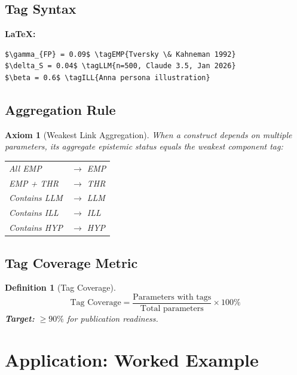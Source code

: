 \documentclass[11pt,a4paper]{article}
\newcommand{\tagEMP}[1]{\textcolor{empgreen}{\textbf{[EMP:} #1\textbf{]}}}
\newcommand{\tagLLM}[1]{\textcolor{llmyellow}{\textbf{[LLM:} #1\textbf{]}}}
\newcommand{\tagILL}[1]{\textcolor{illorange}{\textbf{[ILL:} #1\textbf{]}}}
\newtheorem{axiom}{Axiom}[section]
\newtheorem{definition}{Definition}[section]
\begin{document}
\subsection{Tag Syntax}

\textbf{LaTeX:}
\begin{verbatim}
$\gamma_{FP} = 0.09$ \tagEMP{Tversky \& Kahneman 1992}
$\delta_S = 0.04$ \tagLLM{n=500, Claude 3.5, Jan 2026}
$\beta = 0.6$ \tagILL{Anna persona illustration}
\end{verbatim}

\subsection{Aggregation Rule}

\begin{axiom}[Weakest Link Aggregation]
When a construct depends on multiple parameters, its aggregate epistemic status equals the \emph{weakest} component tag:
\begin{center}
\begin{tabular}{ll}
All EMP & $\rightarrow$ EMP \\
EMP + THR & $\rightarrow$ THR \\
Contains LLM & $\rightarrow$ LLM \\
Contains ILL & $\rightarrow$ ILL \\
Contains HYP & $\rightarrow$ HYP \\
\end{tabular}
\end{center}
\end{axiom}

\subsection{Tag Coverage Metric}

\begin{definition}[Tag Coverage]
\begin{equation}
\text{Tag Coverage} = \frac{\text{Parameters with tags}}{\text{Total parameters}} \times 100\%
\end{equation}
\textbf{Target:} $\geq 90\%$ for publication readiness.
\end{definition}


\section{Application: Worked Example}
\label{sec:application}
\end{document}

